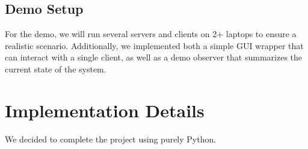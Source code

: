 \documentclass[runningheads]{llncs}
\begin{document}
\subsection{Demo Setup}
For the demo, we will run several servers and clients on 2+ laptops to ensure a realistic scenario.
Additionally, we implemented both a simple GUI wrapper that can interact with a single client, as well as a demo observer that summarizes the current state of the system.
\section{Implementation Details}
We decided to complete the project using purely Python.











\end{document}

